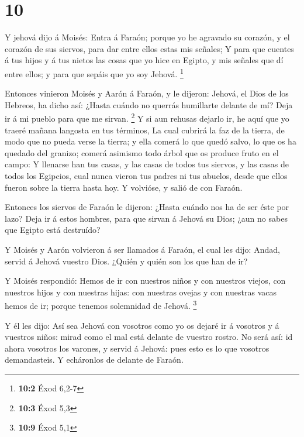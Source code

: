 \hypertarget{section-9}{%
\section{10}\label{section-9}}

 Y jehová dijo á Moisés: Entra á Faraón; porque yo he
agravado su corazón, y el corazón de sus siervos, para dar entre ellos
estas mis señales;  Y para que cuentes á tus hijos y á tus
nietos las cosas que yo hice en Egipto, y mis señales que dí entre
ellos; y para que sepáis que yo soy Jehová. \footnote{\textbf{10:2} Éxod
  6,2-7}

 Entonces vinieron Moisés y Aarón á Faraón, y le dijeron:
Jehová, el Dios de los Hebreos, ha dicho así: ¿Hasta cuándo no querrás
humillarte delante de mí? Deja ir á mi pueblo para que me sirvan.
\footnote{\textbf{10:3} Éxod 5,3}  Y si aun rehusas dejarlo
ir, he aquí que yo traeré mañana langosta en tus términos, 
La cual cubrirá la faz de la tierra, de modo que no pueda verse la
tierra; y ella comerá lo que quedó salvo, lo que os ha quedado del
granizo; comerá asimismo todo árbol que os produce fruto en el campo:
 Y llenarse han tus casas, y las casas de todos tus siervos,
y las casas de todos los Egipcios, cual nunca vieron tus padres ni tus
abuelos, desde que ellos fueron sobre la tierra hasta hoy. Y volvióse, y
salió de con Faraón.

 Entonces los siervos de Faraón le dijeron: ¿Hasta cuándo
nos ha de ser éste por lazo? Deja ir á estos hombres, para que sirvan á
Jehová su Dios; ¿aun no sabes que Egipto está destruído?

 Y Moisés y Aarón volvieron á ser llamados á Faraón, el cual
les dijo: Andad, servid á Jehová vuestro Dios. ¿Quién y quién son los
que han de ir?

 Y Moisés respondió: Hemos de ir con nuestros niños y con
nuestros viejos, con nuestros hijos y con nuestras hijas: con nuestras
ovejas y con nuestras vacas hemos de ir; porque tenemos solemnidad de
Jehová. \footnote{\textbf{10:9} Éxod 5,1}

 Y él les dijo: Así sea Jehová con vosotros como yo os
dejaré ir á vosotros y á vuestros niños: mirad como el mal está delante
de vuestro rostro.  No será así: id ahora vosotros los
varones, y servid á Jehová: pues esto es lo que vosotros demandasteis. Y
echáronlos de delante de Faraón.

